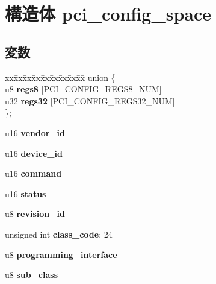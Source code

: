 \section{構造体 pci\-\_\-config\-\_\-space}
\label{structpci__config__space}
\subsection*{変数}
\begin{DoxyCompactItemize}
\item 
\begin{tabbing}
xx\=xx\=xx\=xx\=xx\=xx\=xx\=xx\=xx\=\kill
union \{\\
\>u8 {\bfseries regs8} [PCI\_CONFIG\_REGS8\_NUM]\\
\>u32 {\bfseries regs32} [PCI\_CONFIG\_REGS32\_NUM]\\
\}; \label{structpci__config__space_adf5f11d5e13e259e076e08f987d4920b}
\\

\end{tabbing}\item 
u16 {\bfseries vendor\-\_\-id}\label{structpci__config__space_ae45b9e3e2201cb3c90e0f5cebeb49a07}

\item 
u16 {\bfseries device\-\_\-id}\label{structpci__config__space_a4583fb19e9e19ff4d77affa0dec0e950}

\item 
u16 {\bfseries command}\label{structpci__config__space_ae3c9a7738914370ff471e2290328a93d}

\item 
u16 {\bfseries status}\label{structpci__config__space_a0563f3e9c68363bff3e3680f4034167f}

\item 
u8 {\bfseries revision\-\_\-id}\label{structpci__config__space_a4dd075008b6636210f863609aa990d3c}

\item 
unsigned int {\bfseries class\-\_\-code}\-: 24\label{structpci__config__space_ae1364976b3e31c5733e74da82f07b277}

\item 
u8 {\bfseries programming\-\_\-interface}\label{structpci__config__space_aa6f2525a0abbc42cba92d0556f56c230}

\item 
u8 {\bfseries sub\-\_\-class}\label{structpci__config__space_a06b08502c8d784cc4b59d6469f7df32c}


\end{DoxyCompactItemize}
